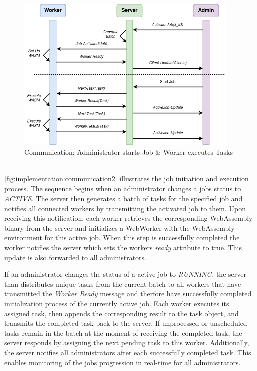 \begin{figure}[htbp]
    \centering
    \includegraphics[width=0.95\textwidth]{gfx/figures/communication-jobexecution.png}
    \caption{Communication: Administrator starts Job \& Worker executes Tasks}
    \label{fig:implementation:communication2}
\end{figure}
~\\
\autoref{fig:implementation:communication2} illustrates the job initiation and execution process. The sequence begins when an administrator changes a jobs status to \emph{ACTIVE}. The server then generates a batch of tasks for the specified job and notifies all connected workers by transmitting the activated job to them. Upon receiving this notification, each worker retrieves the corresponding WebAssembly binary from the server and initializes a WebWorker with the WebAssembly environment for this active job. When this step is successfully completed the worker notifies the server which sets the workers \emph{ready} attribute to true. This update is also forwarded to all administrators.

If an administrator changes the status of a active job to \emph{RUNNING}, the server than distributes unique tasks from the current batch to all workers that have transmitted the \emph{Worker Ready} message and therfore have successfully completed initialization process of the currently active job. Each worker executes its assigned task, then appends the corresponding result to the task object, and transmits the completed task back to the server. If unprocessed or unscheduled tasks remain in the batch at the moment of receiving the completed task, the server responds by assigning the next pending task to this worker. Additionally, the server notifies all administrators after each successfully completed task. This enables monitoring of the jobs progression in real-time for all administrators.

